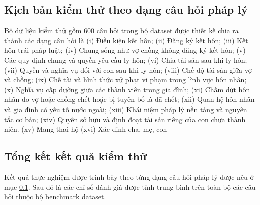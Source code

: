 \documentclass[../DoAn.tex]{subfiles}
\begin{document}
\subsection{Kịch bản kiểm thử theo dạng câu hỏi pháp lý}
\label{subsection:4.9.2}
Bộ dữ liệu kiểm thử gồm 600 câu hỏi trong bộ dataset được thiết kế chia ra thành các dạng câu hỏi là 
(i) Điều kiện kết hôn;
(ii) Đăng ký kết hôn;
(iii) Kết hôn trái pháp luật;
(iv) Chung sống như vợ chồng không đăng ký kết hôn;
(v) Các quy định chung và quyền yêu cầu ly hôn;
(vi) Chia tài sản sau khi ly hôn;
(vii) Quyền và nghĩa vụ đối với con sau khi ly hôn;
(viii) Chế độ tài sản giữa vợ và chồng;
(ix) Chế tài và hình thức xử phạt vi phạm trong lĩnh vực hôn nhân;
(x) Nghĩa vụ cấp dưỡng giữa các thành viên trong gia đình;
(xi) Chấm dứt hôn nhân do vợ hoặc chồng chết hoặc bị tuyên bố là đã chết;
(xii) Quan hệ hôn nhân và gia đình có yếu tố nước ngoài;
(xiii) Khái niệm pháp lý nền tảng và nguyên tắc cơ bản;
(xiv) Quyền sở hữu và định đoạt tài sản riêng của con chưa thành niên.
(xv) Mang thai hộ
(xvi) Xác định cha, mẹ, con

\subsection{Tổng kết kết quả kiểm thử}
\label{subsection:4.9.3}

Kết quả thực nghiệm được trình bày theo từng dạng câu hỏi pháp lý được nêu ở mục \ref{subsection:4.9.2}. Sau đó là các chỉ số đánh giá được tính trung bình trên toàn bộ các câu hỏi thuộc bộ benchmark dataset.
\end{document}

